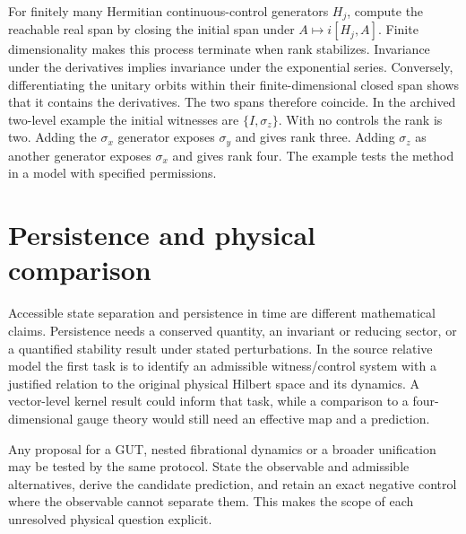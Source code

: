 For finitely many Hermitian continuous-control generators $H_j$, compute the reachable real span by closing the initial span under $A\mapsto i[H_j,A]$. Finite dimensionality makes this process terminate when rank stabilizes. Invariance under the derivatives implies invariance under the exponential series. Conversely, differentiating the unitary orbits within their finite-dimensional closed span shows that it contains the derivatives. The two spans therefore coincide. In the archived two-level example the initial witnesses are $\{I,\sigma_z\}$. With no controls the rank is two. Adding the $\sigma_x$ generator exposes $\sigma_y$ and gives rank three. Adding $\sigma_z$ as another generator exposes $\sigma_x$ and gives rank four. The example tests the method in a model with specified permissions.

\section{Persistence and physical comparison}
Accessible state separation and persistence in time are different mathematical claims. Persistence needs a conserved quantity, an invariant or reducing sector, or a quantified stability result under stated perturbations. In the source relative model the first task is to identify an admissible witness/control system with a justified relation to the original physical Hilbert space and its dynamics. A vector-level kernel result could inform that task, while a comparison to a four-dimensional gauge theory would still need an effective map and a prediction.

Any proposal for a GUT, nested fibrational dynamics or a broader unification may be tested by the same protocol. State the observable and admissible alternatives, derive the candidate prediction, and retain an exact negative control where the observable cannot separate them. This makes the scope of each unresolved physical question explicit.
